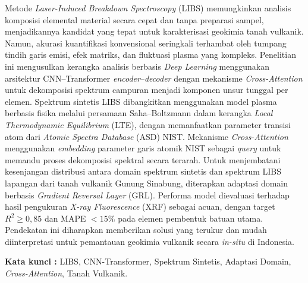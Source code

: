 \begin{abstractind}

Metode \textit{Laser-Induced Breakdown Spectroscopy} (LIBS) memungkinkan analisis komposisi elemental material secara cepat dan tanpa preparasi sampel, menjadikannya kandidat yang tepat untuk karakterisasi geokimia tanah vulkanik. Namun, akurasi kuantifikasi konvensional seringkali terhambat oleh tumpang tindih garis emisi, efek matriks, dan fluktuasi plasma yang kompleks. Penelitian ini mengusulkan kerangka analisis berbasis \textit{Deep Learning} menggunakan arsitektur CNN--Transformer \textit{encoder}--\textit{decoder} dengan mekanisme \textit{Cross-Attention} untuk dekomposisi spektrum campuran menjadi komponen unsur tunggal per elemen. Spektrum sintetis LIBS dibangkitkan menggunakan model plasma berbasis fisika melalui persamaan Saha--Boltzmann dalam kerangka \textit{Local Thermodynamic Equilibrium} (LTE), dengan memanfaatkan parameter transisi atom dari \textit{Atomic Spectra Database} (ASD) NIST. Mekanisme \textit{Cross-Attention} menggunakan \textit{embedding} parameter garis atomik NIST sebagai \textit{query} untuk memandu proses dekomposisi spektral secara terarah. Untuk menjembatani kesenjangan distribusi antara domain spektrum sintetis dan spektrum LIBS lapangan dari tanah vulkanik Gunung Sinabung, diterapkan adaptasi domain berbasis \textit{Gradient Reversal Layer} (GRL). Performa model dievaluasi terhadap hasil pengukuran \textit{X-ray Fluorescence} (XRF) sebagai acuan, dengan target $R^2 \geq 0{,}85$ dan MAPE $< 15\%$ pada elemen pembentuk batuan utama. Pendekatan ini diharapkan memberikan solusi yang terukur dan mudah diinterpretasi untuk pemantauan geokimia vulkanik secara \textit{in-situ} di Indonesia.

\bigskip
\noindent
\textbf{Kata kunci :} LIBS, CNN-Transformer, Spektrum Sintetis, Adaptasi Domain, \textit{Cross-Attention}, Tanah Vulkanik.
\end{abstractind}

